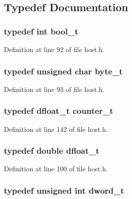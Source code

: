 \subsection{Typedef Documentation}
\subsubsection[{bool\_\-t}]{\setlength{\rightskip}{0pt plus 5cm}typedef int {\bf bool\_\-t}}\label{host_8h_812d16e5494522586b3784e55d479912}




Definition at line 92 of file host.h.
\subsubsection[{byte\_\-t}]{\setlength{\rightskip}{0pt plus 5cm}typedef unsigned char {\bf byte\_\-t}}\label{host_8h_780bd50362a995b802eb8e00f4b0c200}




Definition at line 93 of file host.h.
\subsubsection[{counter\_\-t}]{\setlength{\rightskip}{0pt plus 5cm}typedef {\bf dfloat\_\-t} {\bf counter\_\-t}}\label{host_8h_14de020ee0096509154b24721dbc901a}




Definition at line 142 of file host.h.
\subsubsection[{dfloat\_\-t}]{\setlength{\rightskip}{0pt plus 5cm}typedef double {\bf dfloat\_\-t}}\label{host_8h_a868c96e84b68199876fe544fd0b5a7c}




Definition at line 100 of file host.h.
\subsubsection[{dword\_\-t}]{\setlength{\rightskip}{0pt plus 5cm}typedef unsigned int {\bf dword\_\-t}}\label{host_8h_064e4defdc308749258f722d81981cac}




